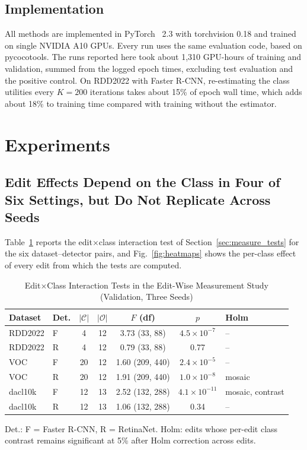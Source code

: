 \documentclass[conference]{IEEEtran}
\begin{document}
\subsection{Implementation}
\label{sec:setup_impl}

All methods are implemented in PyTorch~\cite{paszke2019pytorch} 2.3 with torchvision 0.18 and trained on single NVIDIA A10 GPUs. Every run uses the same evaluation code, based on pycocotools. The runs reported here took about 1,310 GPU-hours of training and validation, summed from the logged epoch times, excluding test evaluation and the positive control. On RDD2022 with Faster R-CNN, re-estimating the class utilities every $K=200$ iterations takes about 15\% of epoch wall time, which adds about 18\% to training time compared with training without the estimator.


\section{Experiments}
\label{sec:results}

\subsection{Edit Effects Depend on the Class in Four of Six Settings, but Do Not Replicate Across Seeds}
\label{sec:results_measurement}

Table~\ref{tab:interaction} reports the edit$\times$class interaction test of Section~\ref{sec:measure_tests} for the six dataset--detector pairs, and Fig.~\ref{fig:heatmaps} shows the per-class effect of every edit from which the tests are computed.

\begin{table}[t]
\caption{Edit$\times$Class Interaction Tests in the Edit-Wise Measurement Study (Validation, Three Seeds)}
\label{tab:interaction}
\centering
\footnotesize
\setlength{\tabcolsep}{2.6pt}
\begin{tabular}{@{}llccccl@{}}
\toprule
\textbf{Dataset} & \textbf{Det.} & $|\mathcal{C}|$ & $|\mathcal{O}|$ & $F$ (df) & $p$ & \textbf{Holm} \\
\midrule
RDD2022 & F & 4 & 12 & 3.73 (33, 88) & $4.5\times10^{-7}$ & -- \\
RDD2022 & R & 4 & 12 & 0.79 (33, 88) & 0.77 & -- \\
VOC & F & 20 & 12 & 1.60 (209, 440) & $2.4\times10^{-5}$ & -- \\
VOC & R & 20 & 12 & 1.91 (209, 440) & $1.0\times10^{-8}$ & mosaic \\
dacl10k & F & 12 & 13 & 2.52 (132, 288) & $4.1\times10^{-11}$ & mosaic, contrast \\
dacl10k & R & 12 & 13 & 1.06 (132, 288) & 0.34 & -- \\
\bottomrule
\end{tabular}
\vspace{2pt}

\parbox{\columnwidth}{\footnotesize Det.: F = Faster R-CNN, R = RetinaNet. Holm: edits whose per-edit class contrast remains significant at 5\% after Holm correction across edits.}
\end{table}
\end{document}
